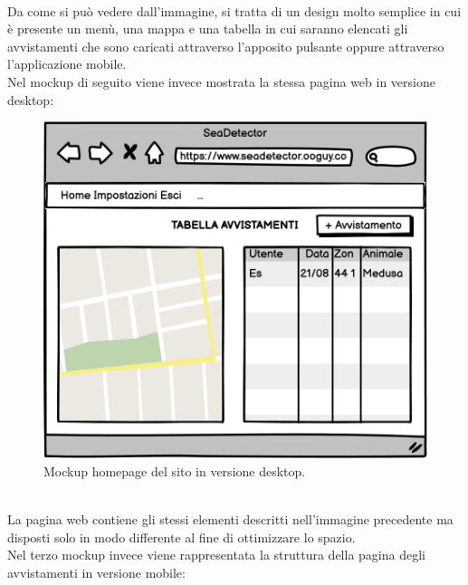 \documentclass[a4paper,final,12pt]{report}
\begin{document}
\\Da come si può vedere dall'immagine, si tratta di un design molto semplice in cui è presente un menù, una mappa e una tabella in cui saranno elencati gli avvistamenti che sono caricati attraverso l'apposito pulsante oppure attraverso l'applicazione mobile.\\
Nel mockup di seguito viene invece mostrata la stessa pagina web in versione desktop: 
\begin{figure}[hbtp]
\centering
\includegraphics[scale=0.90]{img_concettuale/Home.png}
\caption{Mockup homepage del sito in versione desktop.}
	\end{figure}
\\La pagina web contiene gli stessi elementi descritti nell'immagine precedente ma disposti solo in modo differente al fine di ottimizzare lo spazio.\\
Nel terzo mockup invece viene rappresentata la struttura della pagina degli avvistamenti in versione mobile:
\end{document}

